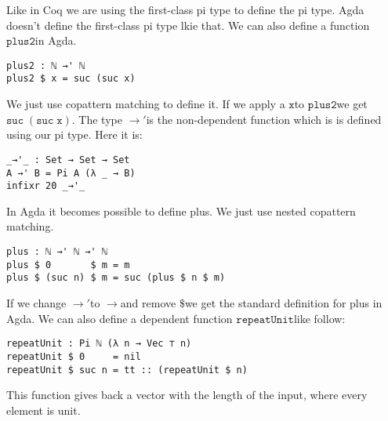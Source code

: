 \documentclass[a4paper,cleardoubleempty,BCOR1cm]{scrbook}
\begin{document}
Like in Coq we are using the first-class pi type to define the pi type. Agda
doesn't define the first-class pi type lkie that.  We
can also define a function $\mathtt{plus2}$\;in Agda.

\begin{verbatim}
plus2 : ℕ →' ℕ
plus2 $ x = suc (suc x)
\end{verbatim}

We just use copattern matching to define it. If we apply a $\mathtt{x}$\;to $\mathtt{plus2}$\;we
get \linebreak $\mathtt{suc\;(suc\;x)}$. The type $\mathtt{\rightarrow'}$\;is the non-dependent
function which is is defined
using our pi type. Here it is:

\begin{verbatim}
_→'_ : Set → Set → Set
A →' B = Pi A (λ _ → B)
infixr 20 _→'_
\end{verbatim}

In Agda it becomes possible to define plus. We just use nested copattern
matching.

\begin{verbatim}
plus : ℕ →' ℕ →' ℕ
plus $ 0       $ m = m
plus $ (suc n) $ m = suc (plus $ n $ m)
\end{verbatim}

If we change $\mathtt{\rightarrow'}$\;to $\mathtt{\rightarrow}$\;and remove $\mathtt{\$}$\;we get the
standard definition for plus in Agda. We can also define a dependent function
$\mathtt{repeatUnit}$\;like follow:
\begin{verbatim}
repeatUnit : Pi ℕ (λ n → Vec ⊤ n)
repeatUnit $ 0     = nil
repeatUnit $ suc n = tt :: (repeatUnit $ n)
\end{verbatim}
This function gives back a vector with the length of the input, where every element
is unit.
\end{document}
